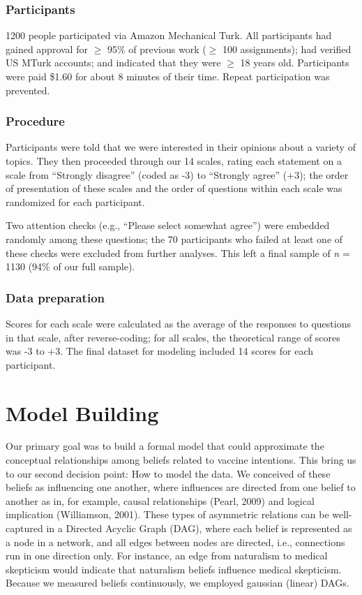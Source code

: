 \documentclass[10pt, letterpaper]{article}
\begin{document}
\subsubsection{Participants}\label{participants}

1200 people participated via Amazon Mechanical Turk. All participants
had gained approval for \(\geq\) 95\% of previous work (\(\geq\) 100
assignments); had verified US MTurk accounts; and indicated that they
were \(\geq\) 18 years old. Participants were paid \$1.60 for about 8
minutes of their time. Repeat participation was prevented.

\subsubsection{Procedure}\label{procedure}

Participants were told that we were interested in their opinions about a
variety of topics. They then proceeded through our 14 scales, rating
each statement on a scale from ``Strongly disagree'' (coded as -3) to
``Strongly agree'' (+3); the order of presentation of these scales and
the order of questions within each scale was randomized for each
participant.

Two attention checks (e.g., ``Please select somewhat agree'') were
embedded randomly among these questions; the 70 participants who failed
at least one of these checks were excluded from further analyses. This
left a final sample of \emph{n} = 1130 (94\% of our full sample).

\subsubsection{Data preparation}\label{data-preparation}

Scores for each scale were calculated as the average of the responses to
questions in that scale, after reverse-coding; for all scales, the
theoretical range of scores was -3 to +3. The final dataset for modeling
included 14 scores for each participant.

\section{Model Building}\label{model-building}

Our primary goal was to build a formal model that could approximate the
conceptual relationships among beliefs related to vaccine intentions.
This bring us to our second decision point: How to model the data. We
conceived of these beliefs as influencing one another, where influences
are directed from one belief to another as in, for example, causal
relationships (Pearl, 2009) and logical implication (Williamson, 2001).
These types of asymmetric relations can be well-captured in a Directed
Acyclic Graph (DAG), where each belief is represented as a node in a
network, and all edges between nodes are directed, i.e., connections run
in one direction only. For instance, an edge from naturalism to medical
skepticism would indicate that naturalism beliefs influence medical
skepticism. Because we measured beliefs continuously, we employed
gaussian (linear) DAGs.
\end{document}
